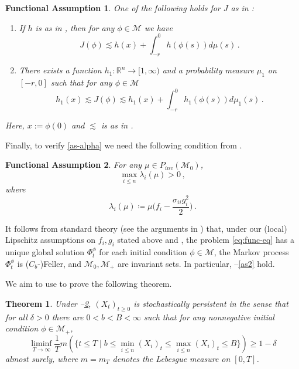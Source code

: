 \documentclass[final]{amsart}
\newtheorem{fass}{Functional Assumption}[]
\newtheorem{thm}{Theorem}
\numberwithin{thm}{section}
\numberwithin{equation}{section}
\newcommand{\mcM}{\mathcal{M}}
\newcommand{\R}{\mathbb{R}}
\newcommand{\inv}{\mathcal{M}_+}
\begin{document}
\begin{fass}\label{fass2}
    One of the following holds for $J$ as in :
    \begin{enumerate}[label=(\roman*)]
        \item If $h$ is as in , then for any $\phi \in \mcM$ we have 
        \begin{equation}\label{eq:fass-1}
            J(\phi) \lesssim h(x) + \int_{-r}^0 h(\phi(s))d\mu(s)\,.
        \end{equation}
        \item There exists a function $h_1: \R^n \to [1,\infty)$ and a probability measure $\mu_1$ on $[-r,0]$ such that 
        for any $\phi \in \mcM$
        \begin{equation}\label{eq:fass-2}
            h_1(x) \lesssim J(\phi) \lesssim h_1(x) + \int_{-r}^0 h_1(\phi(s))d\mu_1(s)\,.
        \end{equation}
    \end{enumerate}
    Here, $x := \phi(0)$ and $\lesssim$ is as in .
    
\end{fass}

Finally, to verify \ref{as-alpha} we need the following condition from \cite[Assumption 2.3]{functional}.
\begin{fass}\label{fass3}
    For any $\mu \in P_{inv}(\mcM_0)$,
    $$\max_{i \leq n} \lambda_i(\mu) > 0 \,,$$ where
    $$\lambda_i(\mu) \coloneqq \mu\Big(f_i - \frac{\sigma_{ii}g_i^2}{2}\Big) \,.$$
\end{fass}

It follows from standard theory (see the arguments in \cite{functional}) that, under our (local) Lipschitz assumptions on $f_i, g_i$ stated above and , the problem \eqref{eq:func-eq} has a unique global solution $\Phi_t^\phi$ for each initial condition $\phi \in \mcM$, the Markov process $\Phi_t^\phi$ is ($C_b$-)Feller, and $\mcM_0, \inv$ are invariant sets. In particular, --\ref{as2} hold.

We aim to use  to prove the following theorem.

\begin{thm}\label{functional-thm}
    Under --\ref{fass3}, $(X_t)_{t\geq 0}$ is stochastically persistent in the sense that for all $\delta > 0$ there are $0 < b < B < \infty$ such that for any nonnegative initial condition $\phi \in \inv$, 
    $$
    \liminf_{T \to \infty} \frac{1}{T}m(\{t \leq T \mid b \leq \min_{i \leq n} (X_i)_t \leq \max_{i \leq n} (X_i)_t \leq B\}) \geq 1 - \delta
    $$ 
    almost surely, where $m=m_T$ denotes the Lebesgue measure on $[0, T]$.
\end{thm}
\end{document}
